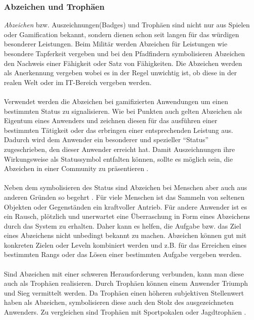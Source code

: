 \documentclass[a4paper,12pt,twoside]{scrartcl}
\begin{document}
\subsubsection{Abzeichen und Trophäen} 
\textit{Abzeichen} bzw. Auszeichnungen(Badges) und Trophäen sind nicht nur aus Spielen oder Gamification bekannt, sondern dienen schon seit langen für das würdigen besonderer Leistungen. Beim Militär werden Abzeichen für Leistungen wie besondere Tapferkeit vergeben und bei den Pfadfindern symbolisieren Abzeichen den Nachweis einer Fähigkeit oder Satz von Fähigkeiten. Die Abzeichen werden als Anerkennung vergeben wobei es in der Regel unwichtig ist, ob diese in der realen Welt oder im IT-Bereich vergeben werden. 
\\\\
Verwendet werden die Abzeichen bei gamifizierten Anwendungen um einen bestimmten Status zu signalisieren. Wie bei Punkten auch gelten Abzeichen als Eigentum eines Anwenders und zeichnen diesen für das ausführen einer bestimmten Tätigkeit oder das erbringen einer entsprechenden Leistung aus. Dadurch wird dem Anwender ein besonderer und spezieller \enquote{Status} zugeschrieben, den dieser Anwender erreicht hat. Damit Auszeichnungen ihre Wirkungsweise als Statussymbol entfalten können, sollte es möglich sein, die Abzeichen in einer Community zu präsentieren \cite{Zichermann2011}.    
\\\\
Neben dem symbolisieren des Status sind Abzeichen bei Menschen aber auch aus anderen Gründen so begehrt \cite{Zichermann2011}. Für viele Menschen ist das Sammeln von seltenen Objekten oder Gegenständen ein kraftvoller Antrieb. Für andere Anwender ist es ein Rausch, plötzlich und unerwartet eine Überraschung in Form eines Abzeichens durch das System zu erhalten. Daher kann es helfen, die Aufgabe bzw. das Ziel eines Abzeichens nicht unbedingt bekannt zu machen. Abzeichen können gut mit konkreten Zielen oder Leveln kombiniert werden und z.B. für das Erreichen eines bestimmten Rangs oder das Lösen einer bestimmten Aufgabe vergeben werden.
\\\\
Sind Abzeichen mit einer schweren Herausforderung verbunden, kann man diese auch als Trophäen realisieren. Durch Trophäen können einem Anwender Triumph und Sieg vermittelt werden. Da Trophäen einen höheren subjektiven Stellenwert haben als Abzeichen, symbolisieren diese auch den Stolz des ausgezeichneten Anwenders. Zu vergleichen sind Trophäen mit Sportpokalen oder Jagdtrophäen \cite{Zichermann2011}.   
\end{document}
